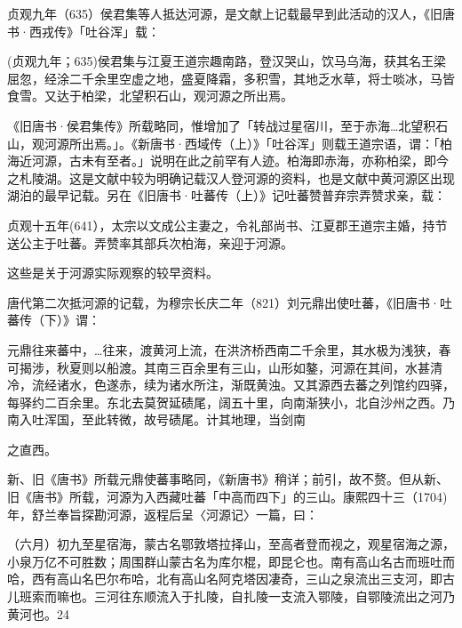 

贞观九年（635）侯君集等人抵达河源，是文献上记载最早到此活动的汉人，《旧唐书·西戎传》「吐谷浑」载：

\begin{BookQuote}
(贞观九年；635)侯君集与江夏王道宗趣南路，登汉哭山，饮马乌海，获其名王梁屈忽，经涂二千余里空虚之地，盛夏降霜，多积雪，其地乏水草，将士啖冰，马皆食雪。又达于柏梁，北望积石山，观河源之所出焉。
\end{BookQuote}

《旧唐书·侯君集传》所载略同，惟增加了「转战过星宿川，至于赤海…北望积石山，观河源所出焉。」。《新唐书·西域传（上）》「吐谷浑」则载王道宗语，谓：「柏海近河源，古未有至者。」说明在此之前罕有人迹。柏海即赤海，亦称柏梁，即今之札陵湖。这是文献中较为明确记载汉人登河源的资料，也是文献中黄河源区出现湖泊的最早记载。另在《旧唐书·吐蕃传（上）》记吐蕃赞普弃宗弄赞求亲，载：

\begin{BookQuote}
贞观十五年(641），太宗以文成公主妻之，令礼部尚书、江夏郡王道宗主婚，持节送公主于吐蕃。弄赞率其部兵次柏海，亲迎于河源。
\end{BookQuote}

这些是关于河源实际观察的较早资料。

唐代第二次抵河源的记载，为穆宗长庆二年（821）刘元鼎出使吐蕃，《旧唐书·吐蕃传（下）》谓：

\begin{BookQuote}
元鼎往来蕃中，…往来，渡黄河上流，在洪济桥西南二千余里，其水极为浅狭，春可揭涉，秋夏则以船渡。其南三百余里有三山，山形如鏊，河源在其间，水甚清冷，流经诸水，色遂赤，续为诸水所注，渐既黄浊。又其源西去蕃之列馆约四驿，每驿约二百余里。东北去莫贺延碛尾，阔五十里，向南渐狭小，北自沙州之西。乃南入吐浑国，至此转微，故号碛尾。计其地理，当剑南
\end{BookQuote}

之直西。

新、旧《唐书》所载元鼎使蕃事略同，《新唐书》稍详；前引，故不赘。但从新、旧《唐书》所载，河源为入西藏吐蕃「中高而四下」的三山。康熙四十三（1704)年，舒兰奉旨探勘河源，返程后呈〈河源记〉一篇，曰：



（六月）初九至星宿海，蒙古名鄂敦塔拉择山，至高者登而视之，观星宿海之源，小泉万亿不可胜数；周围群山蒙古名为库尔棍，即昆仑也。南有高山名古而班吐而哈，西有高山名巴尔布哈，北有高山名阿克塔因凄奇，三山之泉流出三支河，即古儿班索而嘛也。三河往东顺流入于扎陵，自扎陵一支流入鄂陵，自鄂陵流出之河乃黄河也。24

